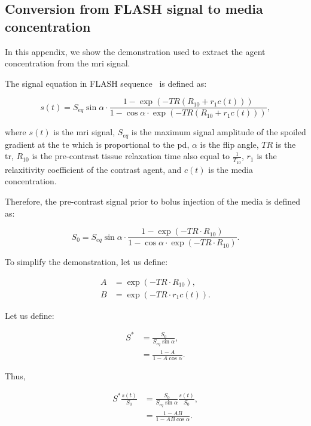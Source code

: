 \begin{appendices}
\section{Conversion from FLASH signal to media concentration}\label{app:signaltoconc}

In this appendix, we show the demonstration used to extract the agent concentration from the \ac{mri} signal.

The signal equation in FLASH sequence~\citep{haase1986flash} is defined as:

\begin{equation}
  s(t) = S_{eq} \sin \alpha \cdot \frac{1 - \exp\left(-TR\left(R_{10} + r_1 c(t)\right)\right)}{1 - \cos \alpha \cdot \exp\left(-TR\left(R_{10} + r_1 c(t)\right)\right)} ,
  \label{eq:app:flash}
\end{equation}

\noindent where $s(t)$ is the \ac{mri} signal, $S_{eq}$ is the maximum signal amplitude of the spoiled gradient at the \ac{te} which is proportional to the \ac{pd}, $\alpha$ is the flip angle, $TR$ is the \acf{tr}, $R_{10}$ is the pre-contrast tissue relaxation time also equal to $\frac{1}{T_{10}}$, $r_1$ is the relaxitivity coefficient of the contrast agent, and $c(t)$ is the media concentration.

Therefore, the pre-contrast signal prior to bolus injection of the media is defined as:

\begin{equation}
  S_0 = S_{eq} \sin \alpha \cdot \frac{1 - \exp\left(-TR \cdot R_{10}\right)}{1 - \cos \alpha \cdot \exp\left(-TR \cdot R_{10}\right)} .
  \label{eq:app:precontrast}
\end{equation}

To simplify the demonstration, let us define:

\begin{align}
  A &= \exp(-TR \cdot R_{10}) , \\
  B &= \exp(-TR \cdot r_1 c(t)) .
\end{align}

Let us define:

\begin{align}
  S^{*} &= \frac{S_0}{S_{eq} \sin \alpha} , \\
  &= \frac{1 - A}{1 - A \cos \alpha} .
\end{align}

Thus,

\begin{align}
  S^{*}\frac{s(t)}{S_0} &= \frac{S_0}{S_{eq}\sin \alpha} \frac{s(t)}{S_0} , \\
  &= \frac{1 - A B}{1 - A B \cos \alpha} .
\end{align}


\end{appendices}

